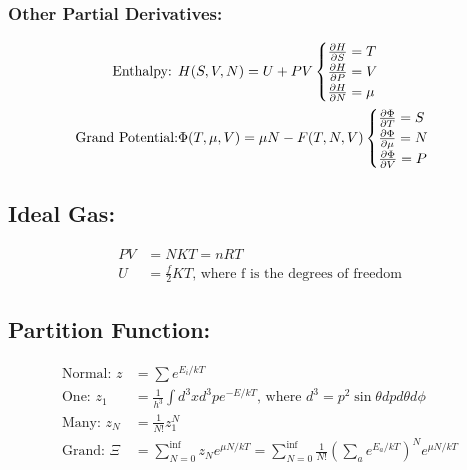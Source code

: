 \subsubsection*{Other Partial Derivatives:}

\begin{align}
	\text{Enthalpy: }       & H(S, V, N) = U + PV
	\begin{cases}
		\pdv{H}{S} = T   \\
		\pdv{H}{P} = V   \\
		\pdv{H}{N} = \mu \\
	\end{cases}                                               \\
	\text{Grand Potential:} & \Phi(T, \mu, V) = \mu N - F(T, N, V)
	\begin{cases}
		\pdv{\Phi}{T} = S   \\
		\pdv{\Phi}{\mu} = N \\
		\pdv{\Phi}{V} = P   \\
	\end{cases}
\end{align}

\subsection*{Ideal Gas:}
\begin{align}
	PV & = NKT = nRT                                                 \\
	U  & = \frac{f}{2} KT \text{, where f is the degrees of freedom}
\end{align}

\subsection*{Partition Function:}

\begin{align}
	\text{Normal:  } z & = \sum e^{E_i / kT}                                                                                            \\
	\text{One: } z_1   & = \frac{1}{h^3} \int d^3x d^3p e^{-E/ kT}\text{, where } d^3 = p^2\sin\theta dp d\theta d\phi                  \\
	\text{Many: } z_N  & = \frac{1}{N!} z_1^N                                                                                           \\
	\text{Grand: } \Xi & = \sum_{N=0}^{\inf} z_N e^{\mu N / kT} = \sum_{N=0}^{\inf} \frac{1}{N!} (\sum_a e^{E_a / kT})^N e^{\mu N / kT}
\end{align}


